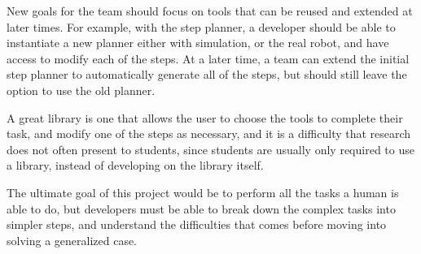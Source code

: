 \documentclass[12pt]{report}
\begin{document}
New goals for the team should focus on tools that can be reused and extended at later times. For example, with the step planner, a developer should be able to instantiate a new planner either with simulation, or the real robot, and have access to modify each of the steps. At a later time, a team can extend the initial step planner to automatically generate all of the steps, but should still leave the option to use the old planner.

A great library is one that allows the user to choose the tools to complete their task, and modify one of the steps as necessary, and it is a difficulty that research does not often present to students, since students are usually only required to use a library, instead of developing on the library itself. 


The ultimate goal of this project would be to perform all the tasks a human is able to do, but  developers must be able to break down the complex tasks into simpler steps, and understand the difficulties that comes before moving into solving a generalized case. 









\nocite{*}
\end{document}
